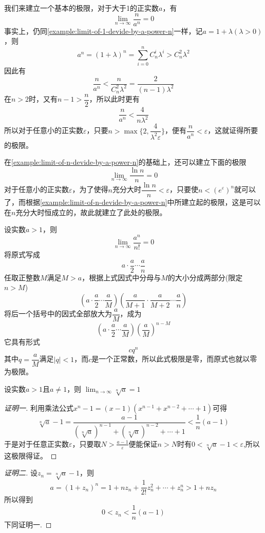 \begin{example}
  \label{example:limit-of-n-devide-by-a-power-n}
  我们来建立一个基本的极限，对于大于1的正实数$a$，有
  \[ \lim_{n \to \infty} \frac{n}{a^n} = 0 \]
  事实上，仍同\autoref{example:limit-of-1-devide-by-a-power-n}一样，记$a=1+\lambda(\lambda>0)$，则
  \[ a^n=(1+\lambda)^n=\sum_{i=0}^nC_n^i\lambda^i > C_n^2 \lambda^2 \]
  因此有
  \[ \frac{n}{a^n} < \frac{n}{C_n^2 \lambda^2} = \frac{2}{(n-1)\lambda^2} \]
  在$n>2$时，又有$n-1>\dfrac{n}{2}$，所以此时更有
  \[ \frac{n}{a^n} < \frac{4}{n\lambda^2} \]
  所以对于任意小的正实数$\varepsilon$，只要$n>\max\{2,\dfrac{4}{\lambda^2\varepsilon}\}$，便有$\dfrac{n}{a^n} < \varepsilon$，这就证得所要的极限。
\end{example}

\begin{example}
  \label{example:limit-of-lnn-devide-by-n}
  在\autoref{example:limit-of-n-devide-by-a-power-n}的基础上，还可以建立下面的极限
  \[ \lim_{n \to \infty} \frac{\ln{n}}{n} = 0 \]
  对于任意小的正实数$\varepsilon$，为了使得$n$充分大时$\dfrac{\ln{n}}{n} < \varepsilon$，只要使$n<(e^{\varepsilon})^n$就可以了，而根据\autoref{example:limit-of-n-devide-by-a-power-n}中所建立起的极限，这是可以在$n$充分大时恒成立的，故此就建立了此处的极限。
\end{example}

\begin{example}
  设实数$a>1$，则
  \[ \lim_{n \to \infty} \frac{a^n}{n!} = 0 \]
  将原式写成
  \[ a \cdot \frac{a}{2} \cdots \frac{a}{n} \]
  任取正整数$M$满足$M>a$，根据上式因式中分母与$M$的大小分成两部分(限定$n>M$)
  \[ \left( a \cdot \frac{a}{2} \cdots \frac{a}{M} \right) \left( \frac{a}{M+1} \cdot \frac{a}{M+2} \cdots \frac{a}{n} \right) \]
  将后一个括号中的因式全部放大为$\dfrac{a}{M}$，成为
  \[ \left( a \cdot \frac{a}{2} \cdots \frac{a}{M} \right) \left( \frac{a}{M} \right)^{n-M} \]
  它具有形式
  \[ c q^n \]
  其中$q=\dfrac{a}{M}$满足$|q|<1$，而$c$是一个正常数，所以此式极限是零，而原式也就以零为极限。
\end{example}

\begin{example}
  \label{example:limit-of-n-sqrt-a-when-a-greater-than-1}
  设实数$a>1$且$a \neq 1$，则 $\lim_{n \to \infty} \sqrt[n]{a} = 1$

  \begin{proof}[证明一]
    利用乘法公式$x^n-1=(x-1)(x^{n-1}+x^{n-2}+\cdots+1)$可得
    \[ \sqrt[n]{a}-1 = \frac{a-1}{(\sqrt[n]{a})^{n-1}+(\sqrt[n]{a})^{n-2}+\cdots+1} < \frac{1}{n}(a-1) \]
   于是对于任意正实数$\varepsilon$，只要取$N>\frac{a-1}{\varepsilon}$便能保证$n>N$时有$0<\sqrt[n]{a}-1<\varepsilon$,所以这极限得证。
  \end{proof}

  \begin{proof}[证明二]
    设$z_n=\sqrt[n]{a}-1$，则
    \[ a = (1+z_n)^n = 1+ nz_n+\frac{1}{2!}z_n^2+\cdots+z_n^n > 1+ n z_n \]
    所以得到
    \[ 0<z_n<\frac{1}{n}(a-1) \]
    下同证明一.
  \end{proof}
\end{example}

